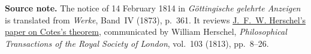 \par\medskip\begin{small}\noindent\textbf{Source note.} The notice of 14 February 1814 in \textit{Göttingische gelehrte Anzeigen} is translated from \textit{Werke}, Band~IV (1873), p.~361. It reviews \href{https://doi.org/10.1098/rstl.1813.0005}{J.~F.~W. Herschel's paper on Cotes's theorem}, communicated by William Herschel, \textit{Philosophical Transactions of the Royal Society of London}, vol.~103 (1813), pp.~8--26.\par\end{small}

